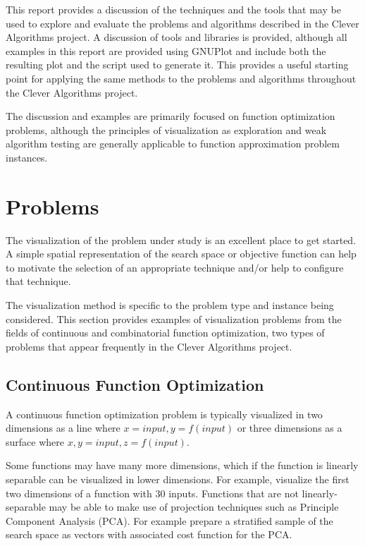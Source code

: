 \documentclass[a4paper, 11pt]{article}
\begin{document}
This report provides a discussion of the techniques and the tools that may be used to explore and evaluate the problems and algorithms described in the Clever Algorithms project. 
A discussion of tools and libraries is provided, although all examples in this report are provided using GNUPlot and include both the resulting plot and the script used to generate it. This provides a useful starting point for applying the same methods to the problems and algorithms throughout the Clever Algorithms project.

The discussion and examples are primarily focused on function optimization problems, although the principles of visualization as exploration and weak algorithm testing are generally applicable to function approximation problem instances.

%
%
\section{Problems}
The visualization of the problem under study is an excellent place to get started. A simple spatial representation of the search space or objective function can help to motivate the selection of an appropriate technique and/or help to configure that technique. 

The visualization method is specific to the problem type and instance being considered. 
This section provides examples of visualization problems from the fields of continuous and combinatorial function optimization, two types of problems that appear frequently in the Clever Algorithms project.

\subsection{Continuous Function Optimization}
A continuous function optimization problem is typically visualized in two dimensions as a line where $x=input, y=f(input)$ or three dimensions as a surface where $x,y=input, z=f(input)$. 

Some functions may have many more dimensions, which if the function is linearly separable can be visualized in lower dimensions. For example, visualize the first two dimensions of a function with 30 inputs. Functions that are not linearly-separable may be able to make use of projection techniques such as Principle Component Analysis (PCA). For example prepare a stratified sample of the search space as vectors with associated cost function for the PCA.
\end{document}

